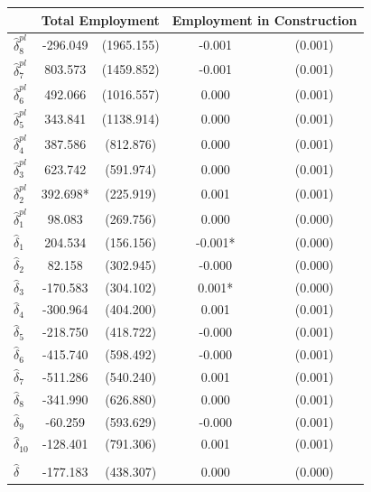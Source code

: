 {
\def\sym#1{\ifmmode^{#1}\else\(^{#1}\)\fi}
\begin{tabular}{l*{2}{cc}}
\toprule
            &\multicolumn{2}{c}{Total Employment}&\multicolumn{2}{c}{Employment in Construction}\\
\midrule
$\hat{\delta}_8^{pl}$&    -296.049   &  (1965.155)&      -0.001   &     (0.001)\\
$\hat{\delta}_7^{pl}$&     803.573   &  (1459.852)&      -0.001   &     (0.001)\\
$\hat{\delta}_6^{pl}$&     492.066   &  (1016.557)&       0.000   &     (0.001)\\
$\hat{\delta}_5^{pl}$&     343.841   &  (1138.914)&       0.000   &     (0.001)\\
$\hat{\delta}_4^{pl}$&     387.586   &   (812.876)&       0.000   &     (0.001)\\
$\hat{\delta}_3^{pl}$&     623.742   &   (591.974)&       0.000   &     (0.001)\\
$\hat{\delta}_2^{pl}$&     392.698*  &   (225.919)&       0.001   &     (0.001)\\
$\hat{\delta}_1^{pl}$&      98.083   &   (269.756)&       0.000   &     (0.000)\\
$\hat{\delta}_1$&     204.534   &   (156.156)&      -0.001*  &     (0.000)\\
$\hat{\delta}_2$&      82.158   &   (302.945)&      -0.000   &     (0.000)\\
$\hat{\delta}_3$&    -170.583   &   (304.102)&       0.001*  &     (0.000)\\
$\hat{\delta}_4$&    -300.964   &   (404.200)&       0.001   &     (0.001)\\
$\hat{\delta}_5$&    -218.750   &   (418.722)&      -0.000   &     (0.001)\\
$\hat{\delta}_6$&    -415.740   &   (598.492)&      -0.000   &     (0.001)\\
$\hat{\delta}_7$&    -511.286   &   (540.240)&       0.001   &     (0.001)\\
$\hat{\delta}_8$&    -341.990   &   (626.880)&       0.000   &     (0.001)\\
$\hat{\delta}_9$&     -60.259   &   (593.629)&      -0.000   &     (0.001)\\
$\hat{\delta}_{10}$&    -128.401   &   (791.306)&       0.001   &     (0.001)\\
\addlinespace&               &            &               &            \\
$\hat{\delta}$&    -177.183   &   (438.307)&       0.000   &     (0.000)\\
\bottomrule
\end{tabular}
}

